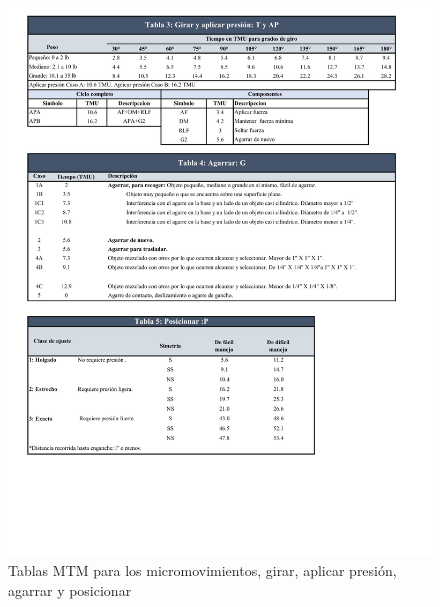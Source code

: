     
    \begin{figure}[H]
        \centering
        \includegraphics[trim = {7mm 10mm 10mm 1mm},clip,scale=0.3]{22/Img/tablasMTM2.pdf}
        \caption{Tablas MTM para los micromovimientos, girar, aplicar presión, agarrar y posicionar}
        \label{tablaMTM2}
    \end{figure}
    
